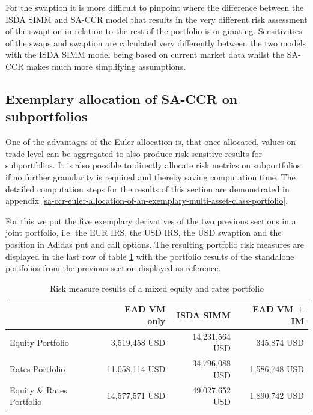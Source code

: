 \documentclass[../Thesis_AHoecherl.tex]{subfiles}
\begin{document}
    For the swaption it is more difficult to pinpoint where the difference between the \gls{ISDA SIMM} and \gls{SA-CCR} model that results in the very different risk assessment of the swaption in relation to the rest of the portfolio is originating.
    Sensitivities of the swaps and swaption are calculated very differently between the two models with the \gls{ISDA SIMM} model being based on current market data whilst the \gls{SA-CCR} makes much more simplifying assumptions. 

    \subsection{Exemplary allocation of SA-CCR on subportfolios\label{sec:Exemplary allocation of SA-CCR on subportfolios}}

    One of the advantages of the Euler allocation is, that once allocated, values on trade level can be aggregated to also produce risk sensitive results for subportfolios. It is also possible to directly allocate risk metrics on subportfolios if no further granularity is required and thereby saving computation time. The detailed computation steps for the results of this section are demonstrated in appendix \ref{sa-ccr-euler-allocation-of-an-exemplary-multi-asset-class-portfolio}. 

    For this we put the five exemplary derivatives of the two previous sections in a joint portfolio, i.e. the EUR \gls{IRS}, the USD \gls{IRS}, the USD swaption and the position in Adidas put and call options.
    The resulting portfolio risk measures are displayed in the last row of table \ref{tab:multiAssetResult} with the portfolio results of the standalone portfolios from the previous section displayed as reference.

    \begin{table}[htbp]
        \centering
        \begin{tabular}{l||r|r|r}
                & \gls{EAD} \gls{VM} only &\gls{ISDA SIMM} & \gls{EAD} \gls{VM} + \gls{IM} \\
                \toprule
        Equity Portfolio & 3,519,458 USD & 14,231,564 USD & 345,874 USD \\
        Rates Portfolio & 11,058,114 USD & 34,796,088 USD & 1,586,748 USD \\
        \midrule
        Equity \& Rates Portfolio & 14,577,571 USD & 49,027,652  USD & 1,890,742 USD \\
        \end{tabular}%
        \caption{Risk measure results of a mixed equity and rates portfolio}
        \label{tab:multiAssetResult}%
    \end{table}%
\end{document}
